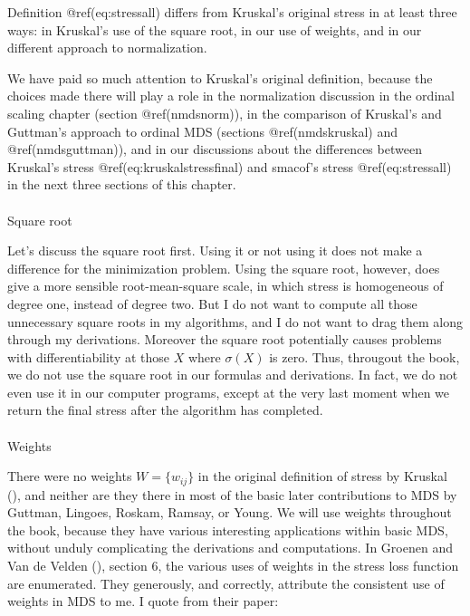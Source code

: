 \documentclass[
  12pt,
  letterpaper,
  DIV=11,
  numbers=noendperiod]{scrartcl}
\makeatletter
\let\oldparagraph\paragraph
\renewcommand{\paragraph}{
    \@ifstar
      \xxxParagraphStar
      \xxxParagraphNoStar
  }
\newcommand{\xxxParagraphStar}[1]{\oldparagraph*{#1}\mbox{}}
\newcommand{\xxxParagraphNoStar}[1]{\oldparagraph{#1}\mbox{}}
\makeatother
\begin{document}
Definition @ref(eq:stressall) differs from Kruskal's original stress in
at least three ways: in Kruskal's use of the square root, in our use of
weights, and in our different approach to normalization.

We have paid so much attention to Kruskal's original definition, because
the choices made there will play a role in the normalization discussion
in the ordinal scaling chapter (section @ref(nmdsnorm)), in the
comparison of Kruskal's and Guttman's approach to ordinal MDS (sections
@ref(nmdskruskal) and @ref(nmdsguttman)), and in our discussions about
the differences between Kruskal's stress @ref(eq:kruskalstressfinal) and
smacof's stress @ref(eq:stressall) in the next three sections of this
chapter.

\paragraph{Square root}\label{square-root}

Let's discuss the square root first. Using it or not using it does not
make a difference for the minimization problem. Using the square root,
however, does give a more sensible root-mean-square scale, in which
stress is homogeneous of degree one, instead of degree two. But I do not
want to compute all those unnecessary square roots in my algorithms, and
I do not want to drag them along through my derivations. Moreover the
square root potentially causes problems with differentiability at those
\(X\) where \(\sigma(X)\) is zero. Thus, througout the book, we do not
use the square root in our formulas and derivations. In fact, we do not
even use it in our computer programs, except at the very last moment
when we return the final stress after the algorithm has completed.

\paragraph{Weights}\label{bweights}

There were no weights \(W=\{w_{ij}\}\) in the original definition of
stress by Kruskal (), and neither are
they there in most of the basic later contributions to MDS by Guttman,
Lingoes, Roskam, Ramsay, or Young. We will use weights throughout the
book, because they have various interesting applications within basic
MDS, without unduly complicating the derivations and computations. In
Groenen and Van de Velden (),
section 6, the various uses of weights in the stress loss function are
enumerated. They generously, and correctly, attribute the consistent use
of weights in MDS to me. I quote from their paper:
\end{document}
